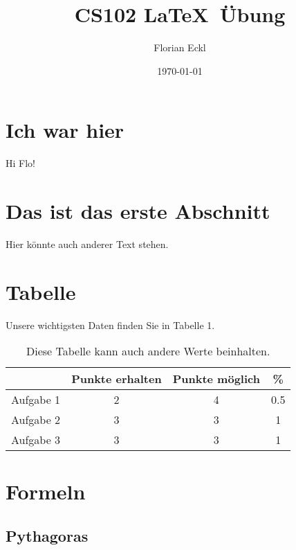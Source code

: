 \documentclass[11pt]{article}
\title{CS102 \LaTeX ~\"Ubung}
\author{Florian Eckl}
\date{\today}
\begin{document}
\maketitle

\section{Ich war hier}

Hi Flo!

\section{Das ist das erste Abschnitt}

Hier k\"onnte auch anderer Text stehen.

\section{Tabelle}

Unsere wichtigsten Daten finden Sie in Tabelle 1.

\begin{table}[!th]

\centering

\begin{tabular}{c|c|c|c}

& Punkte erhalten & Punkte m\"oglich & \% \\

\hline

Aufgabe 1 & 2 & 4 & 0.5 \\

Aufgabe 2 & 3 & 3 & 1 \\

Aufgabe 3 & 3 & 3 & 1 \\

\end{tabular}

\caption{Diese Tabelle kann auch andere Werte beinhalten.}

\label{table:diese Tabelle kann auch andere Werte beinhalten.}

\end{table}

\section{Formeln}

\subsection{Pythagoras}
\end{document}

